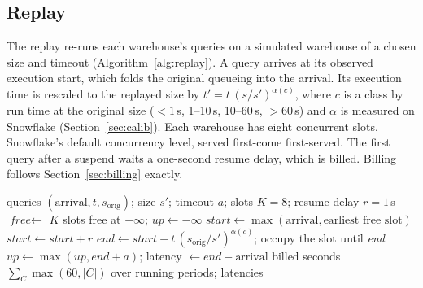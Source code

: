 \documentclass[conference]{IEEEtran}
\begin{document}
\subsection{Replay}
The replay re-runs each warehouse's queries on a simulated warehouse of a chosen size and timeout
(Algorithm~\ref{alg:replay}). A query arrives at its observed execution start, which folds the original queueing into the
arrival. Its execution time is rescaled to the replayed size by $t' = t\,(s/s')^{\alpha(c)}$, where $c$ is a class by
run time at the original size ($<1$\,s, 1--10\,s, 10--60\,s, $>60$\,s) and $\alpha$ is measured on Snowflake
(Section~\ref{sec:calib}). Each warehouse has eight concurrent slots, Snowflake's default concurrency level, served
first-come first-served. The first query after a suspend waits a one-second resume delay, which is billed. Billing follows
Section~\ref{sec:billing} exactly.

\begin{algorithm}[t]
\caption{Replay of one (merged) warehouse}\label{alg:replay}
\small
\begin{algorithmic}[1]
\Require queries $(\text{arrival}, t, s_{\text{orig}})$; size $s'$; timeout $a$; slots $K=8$; resume delay $r=1$\,s
\State $\textit{free} \gets$ $K$ slots free at $-\infty$; $\textit{up} \gets -\infty$ 
  \State $\textit{start} \gets \max(\text{arrival}, \text{earliest free slot})$
   $\textit{start} \gets \textit{start} + r$  \EndIf
  \State $\textit{end} \gets \textit{start} + t\,(s_{\text{orig}}/s')^{\alpha(c)}$; occupy the slot until \textit{end}
  \State $\textit{up} \gets \max(\textit{up}, \textit{end} + a)$; latency $\gets \textit{end} - \text{arrival}$
\EndFor
\State \Return billed seconds $\sum_C \max(60, |C|)$ over running periods; latencies
\end{algorithmic}
\end{algorithm}
\end{document}
